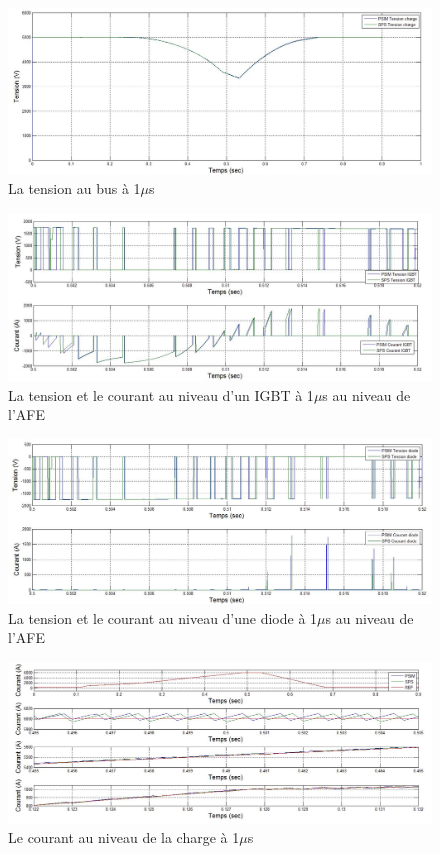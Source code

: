 \documentclass[11pt,letterpaper,final]{report}
\begin{document}
\begin{figure}[htb]
\centering
\includegraphics[scale=0.5]{Fig/DCP_AFE/1u/ten_bus.jpg}
\caption{La tension au bus à 1$\mu$s}
\label{AF_DC_vch1}
\end{figure}


\begin{figure}[htb]
\centering
\includegraphics[scale=0.5]{Fig/DCP_AFE/1u/IGBT_afe.jpg}
\caption{La tension et le courant au niveau d'un IGBT à 1$\mu$s au niveau de l'AFE}
\label{AF_DC_IGBT1}
\end{figure}

\begin{figure}[htb]
\centering
\includegraphics[scale=0.5]{Fig/DCP_AFE/1u/ten_diode_afe.jpg}
\caption{La tension et le courant au niveau d'une diode à 1$\mu$s au niveau de l'AFE}
\label{AF_DC_DI1}
\end{figure}



\begin{figure}[htb]
\centering
\includegraphics[scale=0.5]{Fig/DCP_AFE/1u/cour_ch.jpg}
\caption{Le courant au niveau de la charge à 1$\mu$s}
\label{AF_DC_CHA1}
\end{figure}
\end{document}
